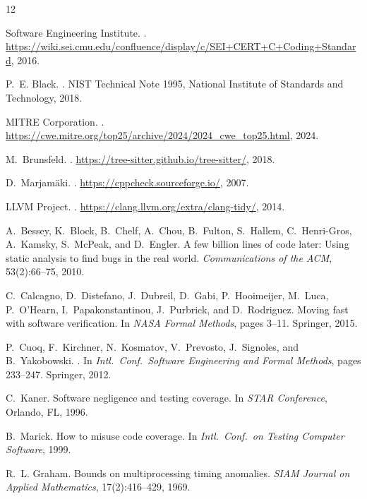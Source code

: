 \documentclass[10pt,twocolumn,letterpaper]{article}
\begin{document}
\begin{thebibliography}{12}

Software Engineering Institute.
.
\newblock \url{https://wiki.sei.cmu.edu/confluence/display/c/SEI+CERT+C+Coding+Standard}, 2016.

P.~E. Black.
.
\newblock NIST Technical Note 1995, National Institute of Standards and
  Technology, 2018.

{MITRE Corporation}.
.
\newblock \url{https://cwe.mitre.org/top25/archive/2024/2024_cwe_top25.html}, 2024.

M.~Brunsfeld.
.
\newblock \url{https://tree-sitter.github.io/tree-sitter/}, 2018.

D.~Marjam{\"a}ki.
.
\newblock \url{https://cppcheck.sourceforge.io/}, 2007.

{LLVM Project}.
.
\newblock \url{https://clang.llvm.org/extra/clang-tidy/}, 2014.

A.~Bessey, K.~Block, B.~Chelf, A.~Chou, B.~Fulton, S.~Hallem, C.~Henri-Gros,
  A.~Kamsky, S.~McPeak, and D.~Engler.
\newblock A few billion lines of code later: Using static analysis to find bugs
  in the real world.
\newblock \emph{Communications of the ACM}, 53(2):66--75, 2010.

C.~Calcagno, D.~Distefano, J.~Dubreil, D.~Gabi, P.~Hooimeijer, M.~Luca,
  P.~O'Hearn, I.~Papakonstantinou, J.~Purbrick, and D.~Rodriguez.
\newblock Moving fast with software verification.
\newblock In \emph{NASA Formal Methods}, pages 3--11. Springer, 2015.

P.~Cuoq, F.~Kirchner, N.~Kosmatov, V.~Prevosto, J.~Signoles, and
  B.~Yakobowski.
.
\newblock In \emph{Intl.\ Conf.\ Software Engineering and Formal
  Methods}, pages 233--247. Springer, 2012.

C.~Kaner.
\newblock Software negligence and testing coverage.
\newblock In \emph{STAR Conference}, Orlando, FL, 1996.

B.~Marick.
\newblock How to misuse code coverage.
\newblock In \emph{Intl.\ Conf.\ on Testing Computer Software}, 1999.

R.~L. Graham.
\newblock Bounds on multiprocessing timing anomalies.
\newblock \emph{SIAM Journal on Applied Mathematics}, 17(2):416--429, 1969.

\end{thebibliography}
\end{document}
